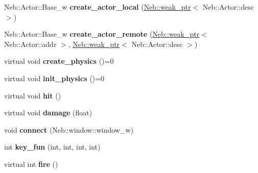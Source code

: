 \begin{DoxyCompactItemize}
\item 
\hypertarget{classNeb_1_1Actor_1_1Base_a33d8f4f168d856b7df8f2eb2e1aaf4ab}{\-Neb\-::\-Actor\-::\-Base\-\_\-w {\bfseries create\-\_\-actor\-\_\-local} (\hyperlink{classNeb_1_1weak__ptr}{\-Neb\-::weak\-\_\-ptr}$<$ \-Neb\-::\-Actor\-::desc $>$)}\label{classNeb_1_1Actor_1_1Base_a33d8f4f168d856b7df8f2eb2e1aaf4ab}

\item 
\hypertarget{classNeb_1_1Actor_1_1Base_aec51ecb6db10f5153e3b50c8d0861766}{\-Neb\-::\-Actor\-::\-Base\-\_\-w {\bfseries create\-\_\-actor\-\_\-remote} (\hyperlink{classNeb_1_1weak__ptr}{\-Neb\-::weak\-\_\-ptr}$<$ \-Neb\-::\-Actor\-::addr $>$, \hyperlink{classNeb_1_1weak__ptr}{\-Neb\-::weak\-\_\-ptr}$<$ \-Neb\-::\-Actor\-::desc $>$)}\label{classNeb_1_1Actor_1_1Base_aec51ecb6db10f5153e3b50c8d0861766}

\item 
\hypertarget{classNeb_1_1Actor_1_1Base_ae5649ec4e6bae0235f5056f8ef877f6e}{virtual void {\bfseries create\-\_\-physics} ()=0}\label{classNeb_1_1Actor_1_1Base_ae5649ec4e6bae0235f5056f8ef877f6e}

\item 
\hypertarget{classNeb_1_1Actor_1_1Base_a84a52d4a51117c510336bcad075f63d1}{virtual void {\bfseries init\-\_\-physics} ()=0}\label{classNeb_1_1Actor_1_1Base_a84a52d4a51117c510336bcad075f63d1}

\item 
\hypertarget{classNeb_1_1Actor_1_1Base_afc072654755bb4db2e1af77a55e7f8dd}{virtual void {\bfseries hit} ()}\label{classNeb_1_1Actor_1_1Base_afc072654755bb4db2e1af77a55e7f8dd}

\item 
\hypertarget{classNeb_1_1Actor_1_1Base_aa8065352d9f093036db30ea7a4e04828}{virtual void {\bfseries damage} (float)}\label{classNeb_1_1Actor_1_1Base_aa8065352d9f093036db30ea7a4e04828}

\item 
\hypertarget{classNeb_1_1Actor_1_1Base_a8c1a19352ced83d68aa58379407bfbc8}{void {\bfseries connect} (\-Neb\-::window\-::window\-\_\-w)}\label{classNeb_1_1Actor_1_1Base_a8c1a19352ced83d68aa58379407bfbc8}

\item 
\hypertarget{classNeb_1_1Actor_1_1Base_a02cc601e428cea2f36c5b8f58bf31749}{int {\bfseries key\-\_\-fun} (int, int, int, int)}\label{classNeb_1_1Actor_1_1Base_a02cc601e428cea2f36c5b8f58bf31749}

\item 
\hypertarget{classNeb_1_1Actor_1_1Base_aa7001c8845e41342c9b01a190c6026a1}{virtual int {\bfseries fire} ()}\label{classNeb_1_1Actor_1_1Base_aa7001c8845e41342c9b01a190c6026a1}


\end{DoxyCompactItemize}
